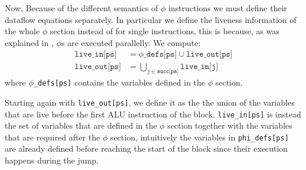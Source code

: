 Now, Because of the different semantics of $\phi$ instructions we must define their dataflow equations separately. In particular we define the liveness information of the whole $\phi$ section instead of for single instructions, this is because, as was explained in , $\phi$s are executed parallelly.
We compute:
\begin{align*}
  \texttt{live\_in[ps]} &= \texttt{$\phi$\_defs[ps]} \cup \texttt{live\_out[ps]} \\
  \texttt{live\_out[ps]} &= \bigcup \limits_{\texttt j \in \texttt{succ[ps]}} \texttt{live\_in[j]}
\end{align*}
where \texttt{$\phi$\_defs[ps]} contains the variables defined in the $\phi$ section.

Starting again with \texttt{live\_out[ps]}, we define it as the the union of the variables that are live before the first ALU instruction of the block. \texttt{live\_in[ps]} is instead the set of variables that are defined in the $\phi$ section together with the variables that are required after the $\phi$ section, intuitively the variables in \texttt{phi\_defs[ps]} are already defined before reaching the start of the block since their execution happens during the jump.





